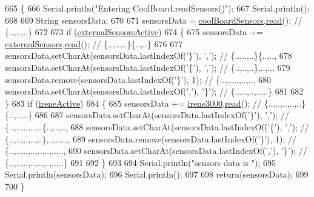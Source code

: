 \begin{DoxyCode}
665 \{
666     Serial.println(\textcolor{stringliteral}{"Entering CoolBoard.readSensors()"});
667     Serial.println();
668 
669     String sensorsData;
670 
671     sensorsData = \hyperlink{classCoolBoard_af102be5288bd7f7a8e59b13f86e26a00}{coolBoardSensors}.\hyperlink{classCoolBoardSensors_a91badb2539d91fda8679f2a597874c48}{read}(); \textcolor{comment}{// \{..,..,..\}}
672     
673     \textcolor{keywordflow}{if} (\hyperlink{classCoolBoard_a638b00b76aeb819ecfd4c10b8cdd7bb7}{externalSensorsActive})
674     \{
675         sensorsData += \hyperlink{classCoolBoard_a09e26264839c65873eb56af476eff6b2}{externalSensors}.\hyperlink{classExternalSensors_a53177b81eca3be89508b5511ddcd00fc}{read}(); \textcolor{comment}{// \{..,..,..\}\{..,..\}}
676 
677         sensorsData.setCharAt(sensorsData.lastIndexOf(\textcolor{charliteral}{'\}'}), \textcolor{charliteral}{','}); \textcolor{comment}{// \{..,..,..\}\{..,..,}
678         sensorsData.setCharAt(sensorsData.lastIndexOf(\textcolor{charliteral}{'\{'}), \textcolor{charliteral}{','}); \textcolor{comment}{// \{..,..,..\},..,..,}
679         sensorsData.remove(sensorsData.lastIndexOf(\textcolor{charliteral}{'\}'}), 1); \textcolor{comment}{// \{..,..,..,..,..,}
680         sensorsData.setCharAt(sensorsData.lastIndexOf(\textcolor{charliteral}{','}), \textcolor{charliteral}{'\}'}); \textcolor{comment}{// \{..,..,..,..,..\}}
681 
682     \}
683     \textcolor{keywordflow}{if} (\hyperlink{classCoolBoard_a9c3f7ac625481ee2ae802a25d97a4ae0}{ireneActive})
684     \{
685         sensorsData += \hyperlink{classCoolBoard_ad103718ce316006c4695b8eb312eaf11}{irene3000}.\hyperlink{classIrene3000_a852a170feea994ea1df01c6b245b5d9a}{read}(); \textcolor{comment}{// \{..,..,..,..,..\}\{..,..,..\}}
686 
687         sensorsData.setCharAt(sensorsData.lastIndexOf(\textcolor{charliteral}{'\}'}), \textcolor{charliteral}{','}); \textcolor{comment}{// \{..,..,..,..,..\{..,..,..,}
688         sensorsData.setCharAt(sensorsData.lastIndexOf(\textcolor{charliteral}{'\{'}), \textcolor{charliteral}{','}); \textcolor{comment}{// \{..,..,..,..,..\},..,..,..,}
689         sensorsData.remove(sensorsData.lastIndexOf(\textcolor{charliteral}{'\}'}), 1); \textcolor{comment}{// \{..,..,..,..,..,..,..,..,}
690         sensorsData.setCharAt(sensorsData.lastIndexOf(\textcolor{charliteral}{','}), \textcolor{charliteral}{'\}'}); \textcolor{comment}{// \{..,..,..,..,..,..,..,..\}}
691         
692     \}
693     
694     Serial.println(\textcolor{stringliteral}{"sensors data is "});
695     Serial.println(sensorsData);
696     Serial.println();
697 
698     \textcolor{keywordflow}{return}(sensorsData);
699 
700 \}
\end{DoxyCode}
